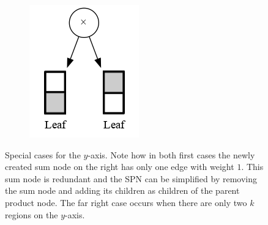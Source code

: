 \documentclass{amsart}
\theoremstyle{plain}
\numberwithin{equation}{section}
\begin{document}
\begin{figure}[h]
\begin{subfigure}[b]{0.3\linewidth}
    \caption{\label{fig:basey-2}}
  \end{subfigure}
  \begin{subfigure}[b]{0.3\linewidth}
    \centering\includegraphics[scale=0.3]{graphs/cc5.png}
    \caption{\label{fig:basey-2}}
  \end{subfigure}
  \captionsetup{justification=raggedright}
  \caption{Special cases for the $y$-axis. Note how in both first cases the newly created sum node
  on the right has only one edge with weight $1$. This sum node is redundant and the SPN can be
  simplified by removing the sum node and adding its children as children of the parent product
  node. The far right case occurs when there are only two $k$ regions on the $y$-axis.}
\end{figure}
\end{document}

